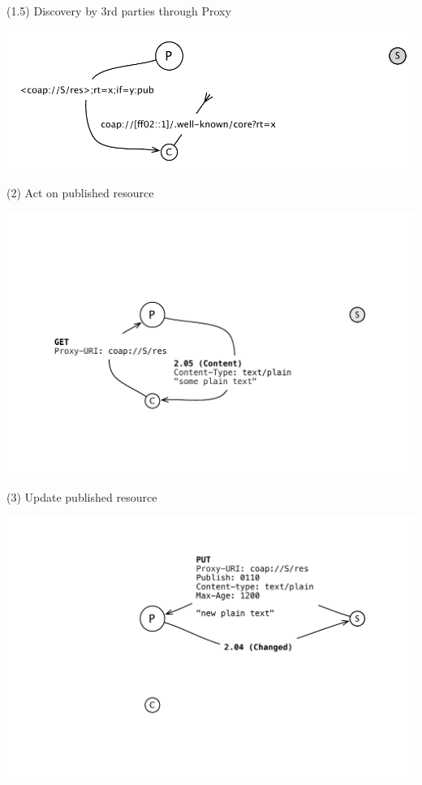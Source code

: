 \documentclass{beamer}
\begin{document}
\begin{frame}{(1.5) Discovery by 3rd parties through Proxy}
 \begin{center}
  \includegraphics[width=\textwidth]{../../share/images/publish-disco.pdf}
 \end{center}
\end{frame}

\begin{frame}{(2) Act on published resource}
 \begin{center}
  \includegraphics[width=\textwidth]{../../share/images/publish1.pdf}
 \end{center}
\end{frame}

\begin{frame}{(3) Update published resource}
 \begin{center}
  \includegraphics[width=\textwidth]{../../share/images/publish2.pdf}
 \end{center}
\end{frame}
\end{document}

